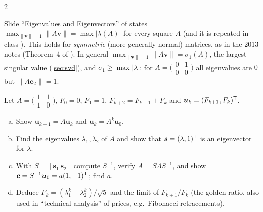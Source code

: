 \begin{paracol}{2}
\begin{coursenote}
Slide ``Eigenvalues and Eigenvectors'' of  states
$\max_{\|\bm v\|=1}\|A\bm v\|=\max|\lambda(A)|$ for every square $A$ (and it is repeated in class
). This holds for \emph{symmetric} (more generally normal) matrices, as in the 2013 notes
(Theorem~4 of ). In general $\max_{\|\bm v\|=1}\|A\bm v\|=\sigma_1(A)$, the largest singular value
(\cref{sec:svd}), and $\sigma_1\ge\max|\lambda|$: for $A=\bigl(\begin{smallmatrix}0&1\\0&0\end{smallmatrix}\bigr)$
all eigenvalues are $0$ but $\|A\bm e_2\|=1$.
\end{coursenote}

\begin{exercise}
Let $A=\bigl(\begin{smallmatrix}1&1\\1&0\end{smallmatrix}\bigr)$, $F_0=0$, $F_1=1$, $F_{k+2}=F_{k+1}+F_k$ and
$\bm u_k=(F_{k+1},F_k)^{\mathsf T}$.
\begin{enumerate}[(a)]
  \item Show $\bm u_{k+1}=A\bm u_k$ and $\bm u_k=A^k\bm u_0$.
  \item Find the eigenvalues $\lambda_1,\lambda_2$ of $A$ and show that $\bm s=(\lambda,1)^{\mathsf T}$ is an eigenvector for $\lambda$.
  \item With $S=[\bm s_1\ \bm s_2]$ compute $S^{-1}$, verify $A=S\Lambda S^{-1}$, and show $\bm c=S^{-1}\bm u_0=a(1,-1)^{\mathsf T}$; find $a$.
  \item Deduce $F_k=(\lambda_1^k-\lambda_2^k)/\sqrt5$ and the limit of $F_{k+1}/F_k$ (the golden ratio, also used in
      ``technical analysis'' of prices, e.g.\ Fibonacci retracements).
\end{enumerate}
\end{exercise}
\begin{mysolution}

\end{mysolution}
\end{paracol}
